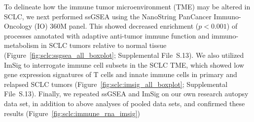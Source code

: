 To delineate how the immune tumor microenvironment (TME) may be altered in SCLC, we next performed ssGSEA using the NanoString PanCancer Immuno-Oncology (IO) 360M panel. This showed decreased enrichment ($p < 0.001$) of processes annotated with adaptive anti-tumor immune function and immuno-metabolism in SCLC tumors relative to normal tissue (Figure~\ref{fig:sclc:ssgsea_all_boxplot}; Supplemental File~S\thechapter{}.13). We also utilized ImSig \cite{nirmal2018} to interrogate immune cell subsets in the SCLC TME, which showed low gene expression signatures of T cells and innate immune cells in primary and relapsed SCLC tumors (Figure~\ref{fig:sclc:imsig_all_boxplot}; Supplemental File~S\thechapter{}.13). Finally, we repeated ssGSEA and ImSig on our own research autopsy data set, in addition to above analyses of pooled data sets, and confirmed these results (Figure~\ref{fig:sclc:immune_rna_imsig})

